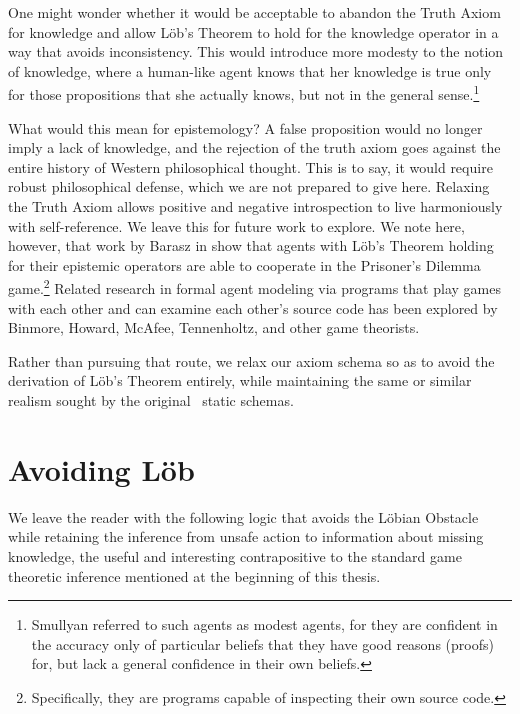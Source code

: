 One might wonder whether it would be acceptable to abandon the Truth Axiom for knowledge and allow L\"ob's Theorem to hold for the knowledge operator in a way that avoids inconsistency. This would introduce more modesty to the notion of knowledge, where a human-like agent knows that her knowledge is true only for those propositions that she actually knows, but not in the general sense.\footnote{Smullyan referred to such agents as modest agents, for they are confident in the accuracy only of particular beliefs that they have good reasons (proofs) for, but lack a general confidence in their own beliefs.} 

What would this mean for epistemology? A false proposition would no longer imply a lack of knowledge, and the rejection of the truth axiom goes against the entire history of Western philosophical thought. This is to say, it would require robust philosophical defense, which we are not prepared to give here. Relaxing the Truth Axiom allows positive and negative introspection to live harmoniously with self-reference. We leave this for future work to explore. We note here, however, that work by Barasz \etal in \cite{modal_prisoner} show that agents with L\"ob's Theorem holding for their epistemic operators are able to cooperate in the Prisoner's Dilemma game.\footnote{Specifically, they are programs capable of inspecting their own source code.} Related research in formal agent modeling via programs that play games with each other and can examine each other's source code has been explored by Binmore, Howard, McAfee, Tennenholtz, and other game theorists.

Rather than pursuing that route, we relax our axiom schema so as to avoid the derivation of L\"ob's Theorem entirely, while maintaining the same or similar realism sought by the original \DASL\ static schemas.

\section{Avoiding L\"ob}
\label{sec:avoiding_lob}
We leave the reader with the following logic that avoids the L\"obian Obstacle while retaining the inference from unsafe action to information about missing knowledge, the useful and interesting contrapositive to the standard game theoretic inference mentioned at the beginning of this thesis.

